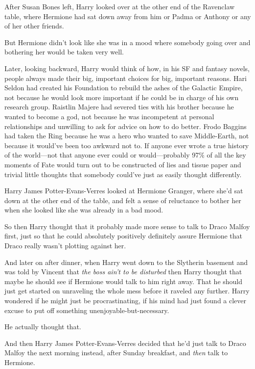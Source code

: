 After Susan Bones left, Harry looked over at the other end of the Ravenclaw
table, where Hermione had sat down away from him or Padma or Anthony or any of
her other friends.

But Hermione didn't look like she was in a mood where somebody going over and
bothering her would be taken very well.

Later, looking backward, Harry would think of how, in his SF and fantasy
novels, people always made their big, important choices for big, important
reasons. Hari Seldon had created his Foundation to rebuild the ashes of the
Galactic Empire, not because he would look more important if he could be in
charge of his own research group. Raistlin Majere had severed ties with his
brother because he wanted to become a god, not because he was incompetent at
personal relationships and unwilling to ask for advice on how to do better.
Frodo Baggins had taken the Ring because he was a hero who wanted to save
Middle-Earth, not because it would've been too awkward not to. If anyone ever
wrote a true history of the world—not that anyone ever could or
would—probably 97\% of all the key moments of Fate would turn out to be
constructed of lies and tissue paper and trivial little thoughts that somebody
could've just as easily thought differently.

Harry James Potter-Evans-Verres looked at Hermione Granger, where she'd sat
down at the other end of the table, and felt a sense of reluctance to bother
her when she looked like she was already in a bad mood.

So then Harry thought that it probably made more sense to talk to Draco Malfoy
first, just so that he could absolutely positively definitely assure Hermione
that Draco really wasn't plotting against her.

And later on after dinner, when Harry went down to the Slytherin basement and
was told by Vincent that \emph{the boss ain't to be disturbed}{\el} then
Harry thought that maybe he should see if Hermione would talk to him right
away. That he should just get started on unraveling the whole mess before it
raveled any further. Harry wondered if he might just be procrastinating, if his
mind had just found a clever excuse to put off something
unenjoyable-but-necessary.

He actually thought that.

And then Harry James Potter-Evans-Verres decided that he'd just talk to Draco
Malfoy the next morning instead, after Sunday breakfast, and \emph{then} talk
to Hermione.

